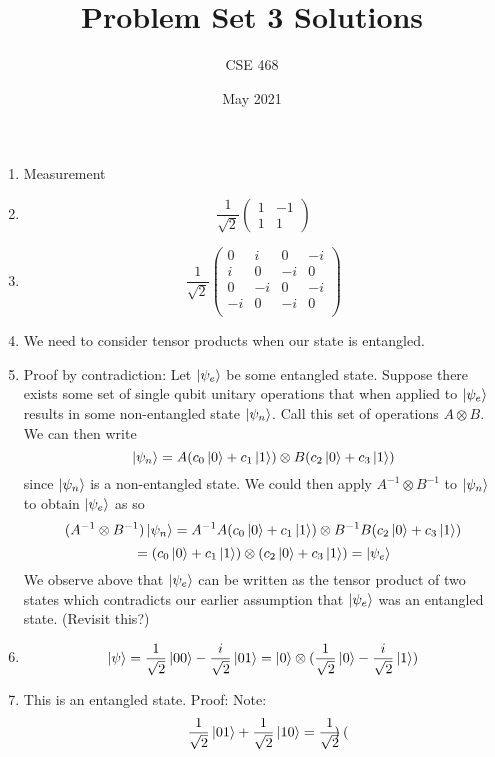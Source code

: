 \documentclass[12pt]{article}
\title{Problem Set 3 Solutions}
\author{CSE 468}
\date{May 2021}
\begin{document}
\maketitle

\begin{enumerate}[font=\bfseries]
    \item Measurement
    \item \[ \frac{1}{\sqrt{2}}\begin{pmatrix}
        1 & -1 \\
        1 & 1
        \end{pmatrix}
        \]
    \item \[ \frac{1}{\sqrt{2}}\begin{pmatrix}
        0 & i & 0 & -i \\
        i & 0 & -i & 0 \\
        0 & -i & 0 & -i \\
        -i & 0 & -i & 0 \\
        \end{pmatrix}
        \]
    \item We need to consider tensor products when our state is entangled.
    \item Proof by contradiction: Let $\ket{\psi_e}$ be some entangled state. Suppose there exists some set of single qubit unitary operations that when applied to $\ket{\psi_e}$ results in some non-entangled state $\ket{\psi_n}$. Call this set of operations $A \otimes B$. We can then write
    \[\ket{\psi_n} = A(c_0\ket{0}+c_1\ket{1}) \otimes B(c_2\ket{0}+c_3\ket{1})\]
    since $\ket{\psi_n}$ is a non-entangled state. We could then apply $A^{-1} \otimes B^{-1}$ to $\ket{\psi_n}$ to obtain $\ket{\psi_e}$ as so
    \[(A^{-1} \otimes B^{-1})\ket{\psi_n} = A^{-1}A(c_0\ket{0}+c_1\ket{1}) \otimes B^{-1}B(c_2\ket{0}+c_3\ket{1})\]
    \[= (c_0\ket{0}+c_1\ket{1}) \otimes (c_2\ket{0}+c_3\ket{1}) = \ket{\psi_e}\]
    We observe above that $\ket{\psi_e}$ can be written as the tensor product of two states which contradicts our earlier assumption that $\ket{\psi_e}$ was an entangled state. (Revisit this?)
    \item \[\ket{\psi} = \frac{1}{\sqrt{2}}\ket{00} - \frac{i}{\sqrt{2}}\ket{01} = \ket{0} \otimes (\frac{1}{\sqrt{2}}\ket{0} - \frac{i}{\sqrt{2}}\ket{1})\]
    \item This is an entangled state. Proof: Note:
    \[\frac{1}{\sqrt{2}}\ket{01} + \frac{1}{\sqrt{2}}\ket{10} = 
            \frac{1}{\sqrt{2}}
            \begin{pmatrix}

\end{pmatrix}\]
\end{enumerate}
\end{document}
